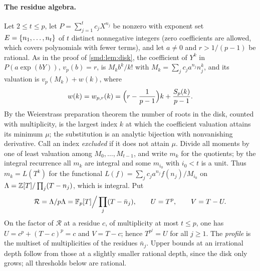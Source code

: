 \paragraph{The residue algebra.}
Let $2\le t\le p$, let $P=\sum_{j=1}^tc_jX^{n_j}$ be nonzero with exponent set
$E=\{n_1,\dots,n_t\}$ of $t$ distinct nonnegative integers (zero coefficients are
allowed, which covers polynomials with fewer terms), and let $a\ne0$ and $r>1/(p-1)$ be
rational. As in the proof of \cref{smd:lem:disk}, the
coefficient of $Y^k$ in $P(a\exp(bY))$, $v_p(b)=r$, is $M_kb^k/k!$ with
$M_k=\sum_jc_ja^{n_j}n_j^k$, and its valuation is $v_p(M_k)+w(k)$, where
\[
 w(k)=w_{p,r}(k)=\Bigl(r-\frac1{p-1}\Bigr)k+\frac{S_p(k)}{p-1}.
\]
By the Weierstrass preparation theorem the number of roots in the disk, counted with
multiplicity, is the largest index $k$ at which the coefficient valuation attains its
minimum $\mu$; the substitution is an analytic bijection with nonvanishing derivative. Call
an index \emph{excluded} if it does not attain $\mu$. Divide all moments by one of least
valuation among $M_0,\dots,M_{t-1}$, and write $m_k$ for the quotients; by the integral
recurrence all $m_k$ are integral and some $m_{i_0}$ with $i_0<t$ is a unit. Thus
$m_k=L(T^k)$ for the functional $L(f)=\sum_jc_ja^{n_j}f(n_j)/M_{i_0}$ on
$\Lambda=\mathbb{Z}[T]/\prod_j(T-n_j)$, which is integral. Put
\[
 \mathcal R=\Lambda/p\Lambda=\mathbb{F}_p[T]\Big/\prod_j(T-\bar n_j),\qquad U=T^p,\qquad V=T-U .
\]
On the factor of $\mathcal R$ at a residue $c$, of multiplicity at most $t\le p$, one has
$U=c^p+(T-c)^p=c$ and $V=T-c$; hence $T^{p^j}=U$ for all $j\ge1$. The \emph{profile} is the
multiset of multiplicities of the residues $\bar n_j$. Upper bounds at an irrational depth
follow from those at a slightly smaller rational depth, since the disk only grows; all
thresholds below are rational.


